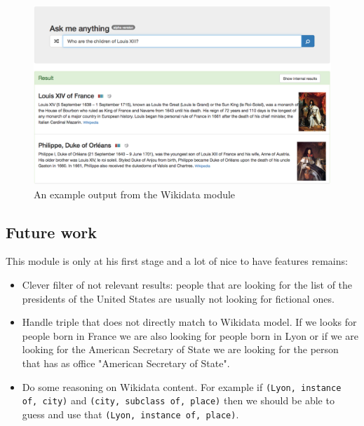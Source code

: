 \begin{figure}[!h]
  \centering
    \label{wikidata:struct}
    \includegraphics[width=\textwidth]{./wikidata_louis13_children.png}
    \caption{An example output from the Wikidata module}
\end{figure}

\subsection{Future work}

This module is only at his first stage and a lot of nice to have features remains:
\begin{itemize}
    \item Clever filter of not relevant results: people that are looking for the list of the presidents of the United States are usually not looking for fictional ones.
    \item Handle triple that does not directly match to Wikidata model. If we looks for people born in France we are also looking for people born in Lyon or if we are looking for the American Secretary of State we are looking for the person that has as office "American Secretary of State".
    \item Do some reasoning on Wikidata content. For example if \texttt{(Lyon, instance of, city)} and \texttt{(city, subclass of, place)} then we should be able to guess and use that \texttt{(Lyon, instance of, place)}.
\end{itemize}
